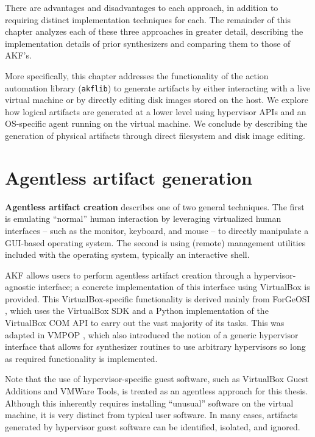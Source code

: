 \documentclass[letterpaper,12pt]{report}
\newcommand{\passthrough}[1]{#1}
\begin{document}
There are advantages and disadvantages to each approach, in addition to
requiring distinct implementation techniques for each. The remainder of
this chapter analyzes each of these three approaches in greater detail,
describing the implementation details of prior synthesizers and
comparing them to those of AKF's.

More specifically, this chapter addresses the functionality of the
action automation library (\passthrough{\lstinline!akflib!}) to generate
artifacts by either interacting with a live virtual machine or by
directly editing disk images stored on the host. We explore how logical
artifacts are generated at a lower level using hypervisor APIs and an
OS-specific agent running on the virtual machine. We conclude by
describing the generation of physical artifacts through direct
filesystem and disk image editing.

\section{Agentless artifact
generation}\label{agentless-artifact-generation}

\textbf{Agentless artifact creation} describes one of two general
techniques. The first is emulating ``normal'' human interaction by
leveraging virtualized human interfaces -- such as the monitor,
keyboard, and mouse -- to directly manipulate a GUI-based operating
system. The second is using (remote) management utilities included with
the operating system, typically an interactive shell.

AKF allows users to perform agentless artifact creation through a
hypervisor-agnostic interface; a concrete implementation of this
interface using VirtualBox is provided. This VirtualBox-specific
functionality is derived mainly from ForGeOSI
\cite{maxfraggMaxfraggForGeOSI2023}, which uses the VirtualBox SDK
and a Python implementation of the VirtualBox COM API
\cite{larsonSethmlarsonVirtualboxpython2025} to carry out the vast
majority of its tasks. This was adapted in VMPOP
\cite{parkTREDEVMPOPCultivating2018}, which also introduced the
notion of a generic hypervisor interface that allows for synthesizer
routines to use arbitrary hypervisors so long as required functionality
is implemented.

Note that the use of hypervisor-specific guest software, such as
VirtualBox Guest Additions and VMWare Tools, is treated as an agentless
approach for this thesis. Although this inherently requires installing
``unusual'' software on the virtual machine, it is very distinct from
typical user software. In many cases, artifacts generated by hypervisor
guest software can be identified, isolated, and ignored.
\end{document}
